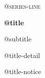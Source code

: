 \vspace*{0.13\textheight}
{\large\scshape @{series-line}\par}
\vspace{1.5em}
{\Huge\bfseries @{title}\par}
\vspace{0.9em}
{\Large @{subtitle}\par}
\vspace{2.2em}
{\large @{title-detail}\par}
\vfill
{\footnotesize @{title-notice}\par}
\vspace{1.2em}
